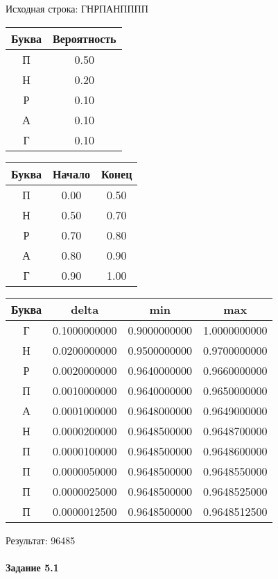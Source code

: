 \documentclass[a4paper, 12pt]{article}
\begin{document}
Исходная строка: ГНРПАНПППП\
\begin{center}
 \begin{tabular}{ |c|c| } 
  \hline
     Буква & Вероятность \\ \hline
П & 0.50\\\hline
Н & 0.20\\\hline
Р & 0.10\\\hline
А & 0.10\\\hline
Г & 0.10
\\ \hline \end{tabular}
\end{center}
\begin{center}
 \begin{tabular}{ |c|c|c| } 
  \hline
     Буква & Начало & Конец \\ \hline
П & 0.00 & 0.50\\\hline
Н & 0.50 & 0.70\\\hline
Р & 0.70 & 0.80\\\hline
А & 0.80 & 0.90\\\hline
Г & 0.90 & 1.00
\\ \hline \end{tabular}
\end{center}
\begin{center}
 \begin{tabular}{ |c|c|c|c| } 
  \hline
     Буква & delta & min & max \\ \hline
Г & 0.1000000000 & 0.9000000000 & 1.0000000000\\\hline
Н & 0.0200000000 & 0.9500000000 & 0.9700000000\\\hline
Р & 0.0020000000 & 0.9640000000 & 0.9660000000\\\hline
П & 0.0010000000 & 0.9640000000 & 0.9650000000\\\hline
А & 0.0001000000 & 0.9648000000 & 0.9649000000\\\hline
Н & 0.0000200000 & 0.9648500000 & 0.9648700000\\\hline
П & 0.0000100000 & 0.9648500000 & 0.9648600000\\\hline
П & 0.0000050000 & 0.9648500000 & 0.9648550000\\\hline
П & 0.0000025000 & 0.9648500000 & 0.9648525000\\\hline
П & 0.0000012500 & 0.9648500000 & 0.9648512500
\\ \hline \end{tabular}
\end{center}
Результат: 96485
\pagebreak
\paragraph{Задание 5.1 \\
}
\end{document}
